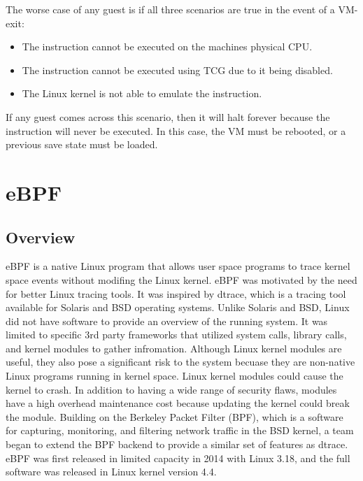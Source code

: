 \documentclass{report}
\begin{document}
\begin{spacing}{1.5}
{\large
\noindent The worse case of any guest is if all three scenarios are true in the event of a VM-exit:

\begin{itemize}
\item  The instruction cannot be executed on the machines physical CPU.
\item  The instruction cannot be executed using TCG due to it being disabled.
\item  The Linux kernel is not able to emulate the instruction.

\end{itemize}

\leavevmode\newline
If any guest comes across this scenario, then it will halt forever because the instruction will never be executed. In this case, the VM must be rebooted, or a previous save state must be loaded.
}








\section{eBPF}

\subsection{Overview}

{\large
eBPF is a native Linux program that allows user space programs to trace kernel space events without modifing the Linux kernel. eBPF was motivated by the need for better Linux tracing tools. It was inspired by dtrace, which is a tracing tool available for Solaris and BSD operating systems. Unlike Solaris and BSD, Linux did not have software to provide an overview of the running system. It was limited to specific 3rd party frameworks that utilized system calls, library calls, and kernel modules to gather infromation. Although Linux kernel modules are useful, they also pose a significant risk to the system becuase they are non-native Linux programs running in kernel space. Linux kernel modules could cause the kernel to crash. In addition to having a wide range of security flaws, modules have a high overhead maintenance cost because updating the kernel could break the module. Building on the Berkeley Packet Filter (BPF), which is a software for capturing, monitoring, and filtering network traffic in the BSD kernel, a team began to extend the BPF backend to provide a similar set of features as dtrace. eBPF was first released in limited capacity in 2014 with Linux 3.18, and the full software was released in Linux kernel version 4.4.
\newline
}


\end{spacing}
\end{document}
